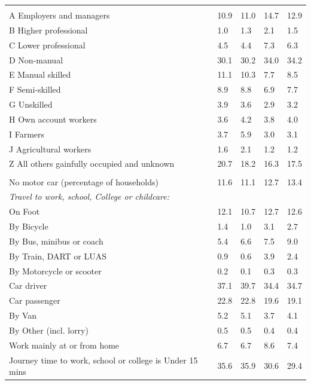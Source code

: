 \documentclass{article}
\begin{document}
\begin{table}[h]
\begin{tabular}{KTTTT}
\hline
    \\ 
    \hline
A Employers and managers & 10.9& 11.0& 14.7& 12.9\\
B Higher professional & 1.0& 1.3& 2.1& 1.5\\
C Lower professional & 4.5& 4.4& 7.3& 6.3\\
D Non-manual & 30.1& 30.2& 34.0& 34.2\\
E Manual skilled & 11.1& 10.3&  7.7&  8.5\\
F Semi-skilled & 8.9& 8.8& 6.9& 7.7\\
G Unskilled & 3.9& 3.6& 2.9& 3.2\\
H Own account workers & 3.6& 4.2& 3.8& 4.0\\
I Farmers & 3.7& 5.9& 3.0& 3.1\\
J Agricultural workers & 1.6& 2.1& 1.2& 1.2\\
Z All others gainfully occupied and unknown & 20.7& 18.2& 16.3& 17.5\\
\hline
{}\hline
    \\ 
    \hline
No motor car (percentage of households) & 11.6& 11.1& 12.7& 
13.4\\
    \hline 
\emph{Travel to work, school, College or childcare:} & & & \\
\quad On Foot & 12.1& 10.7& 12.7& 12.6\\ 
\quad By Bicycle & 1.4& 1.0& 3.1& 2.7\\ 
\quad By Bus, minibus or coach & 5.4& 6.6& 7.5& 9.0\\
\quad By Train, DART or LUAS & 0.9& 0.6& 3.9& 2.4\\
\quad By Motorcycle or scooter & 0.2& 0.1& 0.3& 0.3\\
\quad Car driver & 37.1 & 39.7& 34.4& 34.7\\
\quad Car passenger & 22.8& 22.8& 19.6& 19.1\\
\quad By Van & 5.2& 5.1& 3.7& 4.1\\
\quad By Other (incl. lorry) & 0.5& 0.5& 0.4& 0.4\\
    \hline
Work mainly at or from home & 6.7& 6.7& 8.6& 7.4\\
Journey time to work, school or college is Under 15 mins & 35.6& 35.9& 30.6& 29.4\\

\end{tabular}
\end{table}
\end{document}
